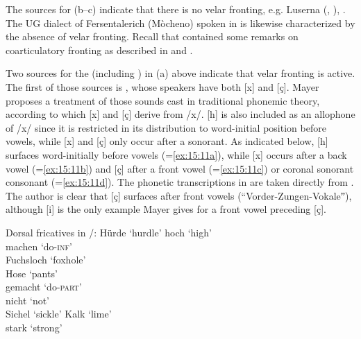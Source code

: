 {The sources for (b--c) indicate that there is no velar fronting, e.g. Luserna (\citealt{Bacher1905}, \citealt{Tyroller2003}),  \citep{Kranzmayer1981}. The UG dialect of Fersentalerich (Mòcheno) spoken in  \citep{Rowley1986} is likewise characterized by the absence of velar fronting. Recall that  contained some remarks on coarticulatory fronting as described in \citet{Kranzmayer1981} and \citet{Rowley1986}.

Two sources for the  (including ) in (a) above indicate that velar fronting is active. The first of those sources is \citet{Mayer1971}, whose speakers have both [x] and [ç]. Mayer proposes a treatment of those sounds cast in traditional phonemic theory, according to which [x] and [ç] derive from /x/.  [h] is also included as an allophone of /x/ since it is restricted in its distribution to word-initial position before vowels, while [x] and [ç] only occur after a sonorant. As indicated below, [h] surfaces word-initially before vowels (=\ref{ex:15:11a}), while [x] occurs after a back vowel (=\ref{ex:15:11b}) and [ç] after a front vowel (=\ref{ex:15:11c}) or coronal sonorant consonant (=\ref{ex:15:11d}). The phonetic transcriptions in  are taken directly from \citet{Mayer1971}. The author is clear that [ç] surfaces after front vowels (“Vorder-Zungen-Vokaleˮ), although [i] is the only example Mayer gives for a front vowel preceding [ç].


\ea%
\label{ex:15:11}Dorsal fricatives in /:
\ea\label{ex:15:11a}\relax [hurrt] \tab Hürde \tab ‘hurdle’ 
\ex\label{ex:15:11b}\relax [hǫax] \tab hoch \tab ‘high’ \\
\relax[maxan] \tab machen \tab ‘do-\textsc{inf}’ \\
\relax[foxlox] \tab Fuchsloch \tab ‘foxhole’ \\
\relax[pruax] \tab Hose \tab ‘pants’ \\
\relax[gəmaxt] \tab gemacht \tab ‘do-\textsc{part}’ \\
\ex\label{ex:15:11c}\relax[niçt] \tab nicht \tab ‘not’ \\
\relax[siçela] \tab Sichel \tab ‘sickle’ 
\ex\label{ex:15:11d}\relax[khalç] \tab Kalk \tab ‘lime’ \\
\relax[starç] \tab stark \tab ‘strong’ 
\z 
\z 

}
